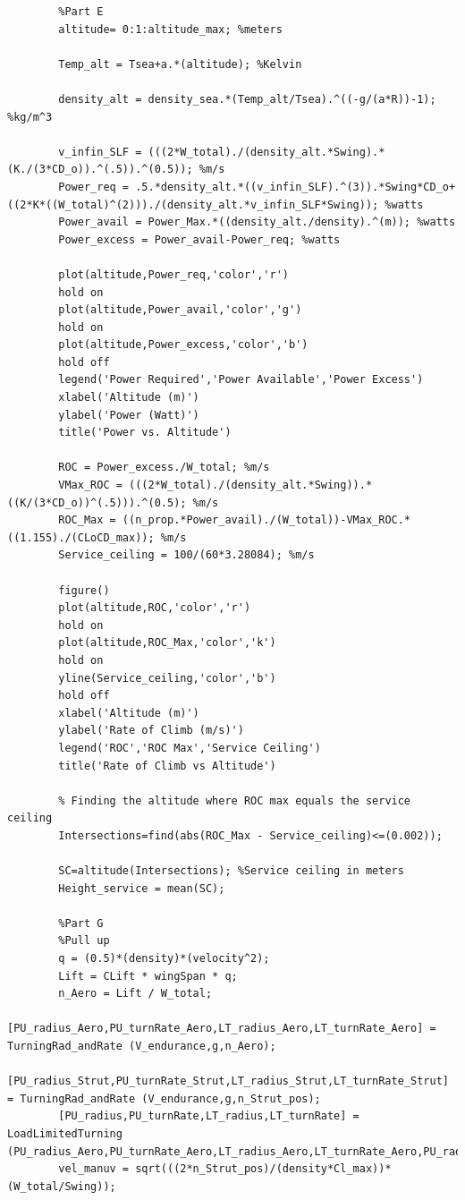 \documentclass[12pt,A4paper]{article}
\begin{document}
\begin{lstlisting}
		%Part E
		altitude= 0:1:altitude_max; %meters
		
		Temp_alt = Tsea+a.*(altitude); %Kelvin
		
		density_alt = density_sea.*(Temp_alt/Tsea).^((-g/(a*R))-1); %kg/m^3
		
		v_infin_SLF = (((2*W_total)./(density_alt.*Swing).*(K./(3*CD_o)).^(.5)).^(0.5)); %m/s
		Power_req = .5.*density_alt.*((v_infin_SLF).^(3)).*Swing*CD_o+((2*K*((W_total)^(2)))./(density_alt.*v_infin_SLF*Swing)); %watts
		Power_avail = Power_Max.*((density_alt./density).^(m)); %watts
		Power_excess = Power_avail-Power_req; %watts
		
		plot(altitude,Power_req,'color','r')
		hold on
		plot(altitude,Power_avail,'color','g')
		hold on
		plot(altitude,Power_excess,'color','b')
		hold off
		legend('Power Required','Power Available','Power Excess')
		xlabel('Altitude (m)')
		ylabel('Power (Watt)')
		title('Power vs. Altitude')
		
		ROC = Power_excess./W_total; %m/s
		VMax_ROC = (((2*W_total)./(density_alt.*Swing)).*((K/(3*CD_o))^(.5))).^(0.5); %m/s
		ROC_Max = ((n_prop.*Power_avail)./(W_total))-VMax_ROC.*((1.155)./(CLoCD_max)); %m/s
		Service_ceiling = 100/(60*3.28084); %m/s
		
		figure()
		plot(altitude,ROC,'color','r')
		hold on
		plot(altitude,ROC_Max,'color','k')
		hold on
		yline(Service_ceiling,'color','b')
		hold off
		xlabel('Altitude (m)')
		ylabel('Rate of Climb (m/s)')
		legend('ROC','ROC Max','Service Ceiling')
		title('Rate of Climb vs Altitude')
		
		% Finding the altitude where ROC max equals the service ceiling
		Intersections=find(abs(ROC_Max - Service_ceiling)<=(0.002));
		
		SC=altitude(Intersections); %Service ceiling in meters
		Height_service = mean(SC);
		
		%Part G
		%Pull up
		q = (0.5)*(density)*(velocity^2);
		Lift = CLift * wingSpan * q;
		n_Aero = Lift / W_total;
		[PU_radius_Aero,PU_turnRate_Aero,LT_radius_Aero,LT_turnRate_Aero] = TurningRad_andRate (V_endurance,g,n_Aero);
		[PU_radius_Strut,PU_turnRate_Strut,LT_radius_Strut,LT_turnRate_Strut] = TurningRad_andRate (V_endurance,g,n_Strut_pos);
		[PU_radius,PU_turnRate,LT_radius,LT_turnRate] = LoadLimitedTurning (PU_radius_Aero,PU_turnRate_Aero,LT_radius_Aero,LT_turnRate_Aero,PU_radius_Strut,PU_turnRate_Strut,LT_radius_Strut,LT_turnRate_Strut);
		vel_manuv = sqrt(((2*n_Strut_pos)/(density*Cl_max))*(W_total/Swing));
		
		
		

\end{lstlisting}
\end{document}
